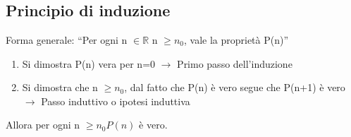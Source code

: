 \chapter[Ripasso Induzione]{}
\section{Principio di induzione}
Forma generale: “Per ogni n $\in \mathbb{R}$ n $\geq n_0$, vale la proprietà P(n)”
\begin{enumerate}
    \item Si dimostra P(n) vera per n=0 $\rightarrow$ Primo passo dell’induzione
    \item Si dimostra che n $\geq n_0$, dal fatto che P(n) è vero segue che P(n+1) 
    è vero $\rightarrow$ Passo induttivo o ipotesi induttiva

\end{enumerate}
Allora per ogni n $ \geq n_0 P(n)$ è vero.
